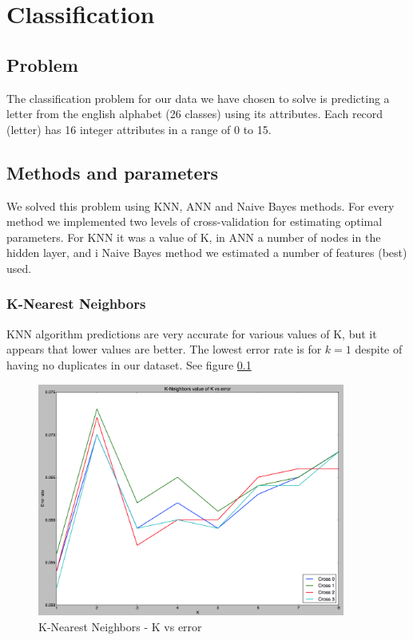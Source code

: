 \chapter*{Classification}
\setcounter{chapter}{2}

\section{Problem}
The classification problem for our data we have chosen to solve is predicting a letter
from the english alphabet (26 classes) using its attributes. Each record (letter) has 16 integer
attributes in a range of 0 to 15. 
\section{Methods and parameters}
We solved this problem using KNN, ANN and Naive Bayes methods. For every method we implemented
two levels of cross-validation for estimating optimal parameters. For KNN it was a value of K, in ANN a number
of nodes in the hidden layer, and i Naive Bayes method we estimated a number of features (best) used. 
\subsection{K-Nearest Neighbors}
KNN algorithm predictions are very accurate for various values of K, but it appears that lower values are better.
The lowest error rate is for $k=1$ despite of having no duplicates in our dataset. See figure \ref{fig:KN_kvalue}
\begin{figure}[!tbh]
	\centering
	\includegraphics[width=0.9\textwidth]{figures/KN_kvalue}
	\caption{K-Nearest Neighbors - K vs error}
	\label{fig:KN_kvalue}
\end{figure}
